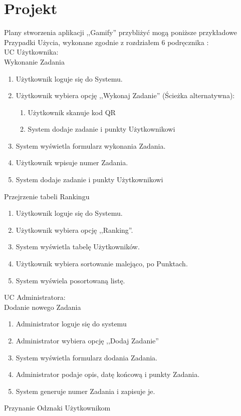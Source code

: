 \documentclass[a4paper,12pt,twoside,openany]{report}
\begin{document}
	\section{Projekt}
	Plany stworzenia aplikacji ,,Gamify'' przybliżyć mogą poniższe przykładowe Przypadki Użycia, wykonane zgodnie z rozdziałem 6 podręcznika \cite{Smialek}:\\
	UC Użytkownika:\\
	Wykonanie Zadania
	\begin{enumerate}
		\item Użytkownik loguje się do Systemu.
		\item Użytkownik wybiera opcję ,,Wykonaj Zadanie'' (Ścieżka alternatywna):
		\begin{enumerate}
		\item Użytkownik skanuje kod QR
		\item System dodaje zadanie i punkty Użytkownikowi
		\end{enumerate}
		\item System wyświetla formularz wykonania Zadania.
		\item Użytkownik wpisuje numer Zadania.
		\item System dodaje zadanie i punkty Użytkownikowi
	\end{enumerate}
	Przejrzenie tabeli Rankingu
	\begin{enumerate}
		\item Użytkownik loguje się do Systemu.
		\item Użytkownik wybiera opcję ,,Ranking''.
		\item System wyświetla tabelę Użytkowników.
		\item Użytkownik wybiera sortowanie malejąco, po Punktach.
		\item System wyświela posortowaną listę.
	\end{enumerate}
	UC Administratora:\\
	Dodanie nowego Zadania
	\begin{enumerate}
		\item Administrator loguje się do systemu
		\item Administrator wybiera opcję ,,Dodaj Zadanie''
		\item System wyświetla formularz dodania Zadania.
		\item Administrator podaje opis, datę końcową i punkty Zadania.
		\item System generuje numer Zadania i zapisuje je.
	\end{enumerate}
	Przynanie Odznaki Użytkownikom
\end{document}

